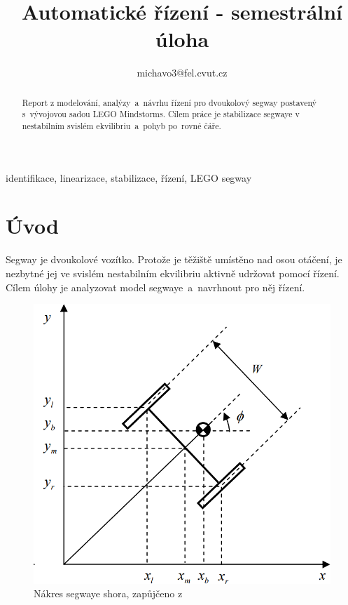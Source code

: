 \documentclass[conference]{IEEEtran}
\begin{document}
\title{Automatické řízení - semestrální úloha}

\author{
michavo3@fel.cvut.cz}

\maketitle

\begin{abstract}
Report z modelování, analýzy~a~návrhu řízení pro dvoukolový segway postavený s~vývojovou sadou LEGO Mindstorms.
Cílem práce je stabilizace segwaye v nestabilním svislém ekvilibriu~a~pohyb po~rovné čáře.
\end{abstract}

\begin{IEEEkeywords}
    identifikace, linearizace, stabilizace, řízení, LEGO segway
\end{IEEEkeywords}

\section{Úvod}
\label{sec:uvod}
Segway je dvoukolové vozítko. Protože je těžiště umístěno nad osou otáčení, je nezbytné jej ve svislém nestabilním
ekvilibriu aktivně udržovat pomocí řízení. Cílem úlohy je analyzovat model segwaye~a~navrhnout pro něj řízení. 

\begin{figure}[htbp]
    \centerline{\includegraphics[width=0.9\linewidth]{segway_shora.png}}
    \caption{Nákres segwaye shora, zapůjčeno z \cite{model_based_design}}
    \label{fig:segway_shora}        
\end{figure}
\end{document}
